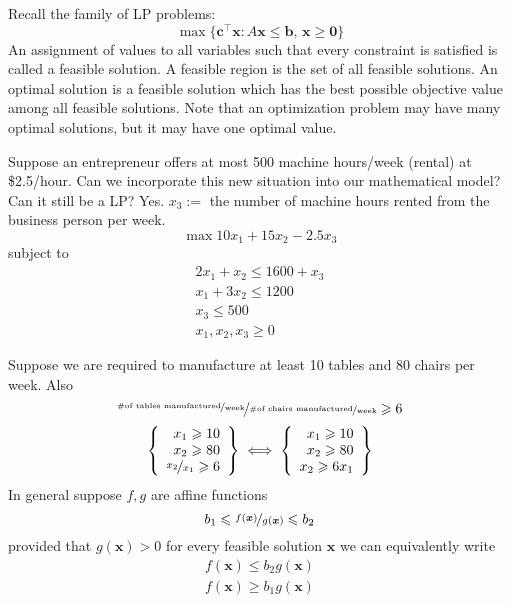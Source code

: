 Recall the family of LP problems:
\[\max \{\bm{c}^\top \bm{x} : A\bm{x}\leqslant \bm{b},\,\bm{x}\geqslant  \bm{0}\} \]
An assignment of values to all variables such that every
constraint is satisfied is called a feasible solution.
A feasible region is the set of all feasible solutions.
An optimal solution is a feasible solution which has the best
possible objective value among all feasible solutions.
Note that an optimization problem may have many optimal
solutions, but it may have one optimal value.

\begin{exbox}
    \begin{example}[Refer to 1.1]
        Suppose an entrepreneur offers at most 500 machine hours/week
        (rental) at \$2.5/hour. Can we incorporate this new situation
        into our mathematical model? Can it still be a LP? Yes.
        $x_3:=$ the number of machine hours rented from the business
        person per week.
        \[\max 10x_1+15x_2-2.5x_3\]
        subject to
        \begin{align*}
            2x_1+x_2\leqslant 1600+x_3 \\
            x_1+3x_2\leqslant 1200     \\
            x_3\leqslant 500           \\
            x_1,x_2,x_3\geqslant  0
        \end{align*}
    \end{example}
\end{exbox}
\begin{exbox}
    \begin{example}
        Suppose we are required to manufacture at least 10 tables and
        80 chairs per week. Also
        \[\nicefrac{\nicefrac{\text{\#of tables manufactured}}{\text{week}}}
            {\nicefrac{\text{\#of chairs manufactured}}{\text{week}}}
            \geqslant  6\]
        \[
            \left\{\begin{array}{r}
                x_1\geqslant  10 \\
                x_2\geqslant  80 \\
                \nicefrac{x_2}{x_1}\geqslant  6
            \end{array}\right\}
            \iff
            \left\{\begin{array}{r}
                x_1\geqslant  10 \\
                x_2\geqslant  80 \\
                x_2\geqslant  6x_1
            \end{array}\right\}
        \]
        In general suppose $f,g$ are affine functions
        \[
            b_1\leqslant \nicefrac{f(\bm{x})}{g(\bm{x})}\leqslant b_2
        \]
        provided that $g(\bm{x})>0$ for every feasible solution $\bm{x}$ we
        can equivalently write
        \begin{align*}
            f(\bm{x})\leqslant b_2 g(\bm{x}) \\
            f(\bm{x})\geqslant  b_1 g(\bm{x})
        \end{align*}
    \end{example}
\end{exbox}


